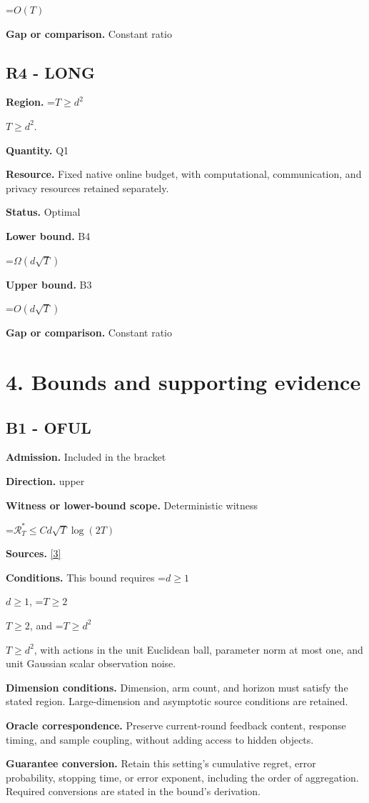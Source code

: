 \documentclass[10pt,a4paper]{article}
\newcommand{\AtlasMath}[1]{\par\begingroup\centering\setbox0=\hbox{$\displaystyle #1$}\ifdim\wd0>1.4\linewidth\typeout{ATLAS WIDE FORMULA: \the\wd0}\fi\ifdim\wd0>\linewidth\resizebox{\linewidth}{!}{\box0}\else\box0\fi\par\endgroup}
\newcommand{\AtlasInlineMath}[1]{\begingroup\setbox0=\hbox{$#1$}\ifdim\wd0>.4\linewidth\endgroup\AtlasMath{#1}\else\endgroup$#1$\fi}
\begin{document}
\AtlasMath{O(T)}
\textbf{Gap or comparison.} Constant ratio

\subsection{R4 - LONG}
\textbf{Region.} \AtlasInlineMath{T\ge d^{2}}.

\textbf{Quantity.} Q1

\textbf{Resource.} Fixed native online budget, with computational, communication, and privacy resources retained separately.

\textbf{Status.} Optimal

\textbf{Lower bound.} B4

\AtlasMath{\Omega(d\sqrt T)}
\textbf{Upper bound.} B3

\AtlasMath{O(d\sqrt T)}
\textbf{Gap or comparison.} Constant ratio

\section{4. Bounds and supporting evidence}
\subsection{B1 - OFUL}
\textbf{Admission.} Included in the bracket

\textbf{Direction.} upper

\textbf{Witness or lower-bound scope.} Deterministic witness

\AtlasMath{\mathcal{R}_T^*\le C d\sqrt T\log(2T)}
\textbf{Sources.} \href{https://proceedings.neurips.cc/paper/2011/file/e1d5be1c7f2f456670de3d53c7b54f4a-Paper.pdf}{[3]}

\textbf{Conditions.} This bound requires \AtlasInlineMath{d\ge1}, \AtlasInlineMath{T\ge2}, and \AtlasInlineMath{T\ge d^2}, with actions in the unit Euclidean ball, parameter norm at most one, and unit Gaussian scalar observation noise.

\textbf{Dimension conditions.} Dimension, arm count, and horizon must satisfy the stated region. Large-dimension and asymptotic source conditions are retained.

\textbf{Oracle correspondence.} Preserve current-round feedback content, response timing, and sample coupling, without adding access to hidden objects.

\textbf{Guarantee conversion.} Retain this setting's cumulative regret, error probability, stopping time, or error exponent, including the order of aggregation. Required conversions are stated in the bound's derivation.
\end{document}
